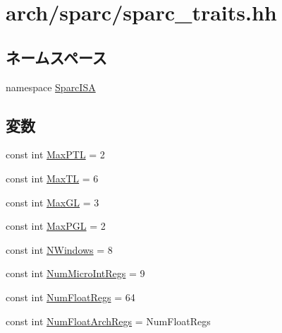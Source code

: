 \hypertarget{sparc__traits_8hh}{
\section{arch/sparc/sparc\_\-traits.hh}
\label{sparc__traits_8hh}
}
\subsection*{ネームスペース}
\begin{DoxyCompactItemize}
\item 
namespace \hyperlink{namespaceSparcISA}{SparcISA}
\end{DoxyCompactItemize}
\subsection*{変数}
\begin{DoxyCompactItemize}
\item 
const int \hyperlink{namespaceSparcISA_adcffeac928f8e9f6b317518b5f789181}{MaxPTL} = 2
\item 
const int \hyperlink{namespaceSparcISA_a8d6a6b2e04f9b3ebcec03466060ff24a}{MaxTL} = 6
\item 
const int \hyperlink{namespaceSparcISA_af56470bc16dfc33549217225934bcd23}{MaxGL} = 3
\item 
const int \hyperlink{namespaceSparcISA_a1a64618a48f1b54d7c50a02b322cba4c}{MaxPGL} = 2
\item 
const int \hyperlink{namespaceSparcISA_a6216686abfee3750d491873b95a05308}{NWindows} = 8
\item 
const int \hyperlink{namespaceSparcISA_a985912475a96ec00a4ff48b39004d43a}{NumMicroIntRegs} = 9
\item 
const int \hyperlink{namespaceSparcISA_a627b25288f2452be107872a138df8b85}{NumFloatRegs} = 64
\item 
const int \hyperlink{namespaceSparcISA_a9ec947def3616ab9415089776195fa09}{NumFloatArchRegs} = NumFloatRegs
\end{DoxyCompactItemize}
